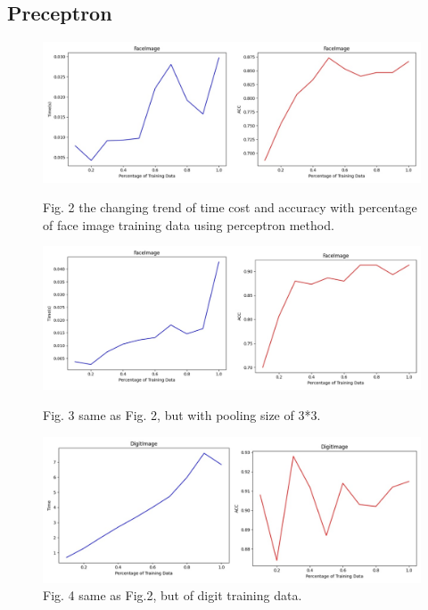 \documentclass{article}
\begin{document}
\subsection{Preceptron}
\begin{figure}[h]
  	\center
  	\includegraphics*[scale=0.27]{fig2.jpg}
	\caption{Fig. 2 the changing trend of time cost and accuracy with percentage of face image training data using perceptron method.}
	\includegraphics*[scale=0.27]{fig3.jpg}
	\caption{Fig. 3 same as Fig. 2, but with pooling size of 3*3.}
	\includegraphics*[scale=0.27]{fig4.jpg}
	\caption{Fig. 4 same as Fig.2, but of digit training data.}
	\label{fig:example}
  \end{figure}
  

\clearpage
\end{document}
